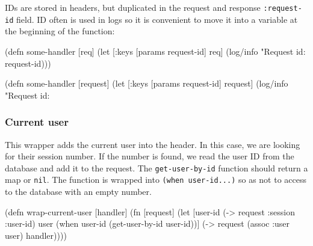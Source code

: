 
IDs are stored in headers, but duplicated in the request and response \verb|:request-id| field. ID often is used in logs so it is convenient to move it into a variable at the beginning of the function:


\ifx\DEVICETYPE\MOBILE

\begin{english}
  \begin{clojure}
(defn some-handler [req]
  (let [{:keys [params request-id]} req]
    (log/info "Request id: %
              request-id)))
  \end{clojure}
\end{english}

\else

\begin{english}
  \begin{clojure}
(defn some-handler [request]
  (let [{:keys [params request-id]} request]
    (log/info "Request id: %
  \end{clojure}
\end{english}

\fi

\subsubsection*{Current user}


This wrapper adds the current user into the header. In this case, we are looking for their session number. If the number is found, we read the user ID from the database and add it to the request. The \verb|get-user-by-id| function should return a map or \verb|nil|. The function is wrapped into \verb|(when user-id...)| so as not to access to the database with an empty number.


\ifx\DEVICETYPE\MOBILE

\begin{english}
  \begin{clojure}
(defn wrap-current-user [handler]
  (fn [request]
    (let [user-id (-> request
                      :session
                      :user-id)
          user (when user-id
                 (get-user-by-id
                   user-id))]
      (-> request
          (assoc :user user)
          handler))))
  \end{clojure}
\end{english}

